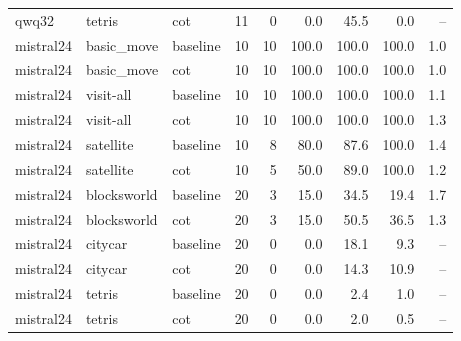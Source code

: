 \begin{tabular}{lllrrrrrr}
qwq32 & tetris & cot & 11 & 0 & 0.0 & 45.5 & 0.0 & -- \\
mistral24 & basic\_move & baseline & 10 & 10 & 100.0 & 100.0 & 100.0 & 1.0 \\
mistral24 & basic\_move & cot & 10 & 10 & 100.0 & 100.0 & 100.0 & 1.0 \\
mistral24 & visit-all & baseline & 10 & 10 & 100.0 & 100.0 & 100.0 & 1.1 \\
mistral24 & visit-all & cot & 10 & 10 & 100.0 & 100.0 & 100.0 & 1.3 \\
mistral24 & satellite & baseline & 10 & 8 & 80.0 & 87.6 & 100.0 & 1.4 \\
mistral24 & satellite & cot & 10 & 5 & 50.0 & 89.0 & 100.0 & 1.2 \\
mistral24 & blocksworld & baseline & 20 & 3 & 15.0 & 34.5 & 19.4 & 1.7 \\
mistral24 & blocksworld & cot & 20 & 3 & 15.0 & 50.5 & 36.5 & 1.3 \\
mistral24 & citycar & baseline & 20 & 0 & 0.0 & 18.1 & 9.3 & -- \\
mistral24 & citycar & cot & 20 & 0 & 0.0 & 14.3 & 10.9 & -- \\
mistral24 & tetris & baseline & 20 & 0 & 0.0 & 2.4 & 1.0 & -- \\
mistral24 & tetris & cot & 20 & 0 & 0.0 & 2.0 & 0.5 & -- \\
\bottomrule
\end{tabular}
